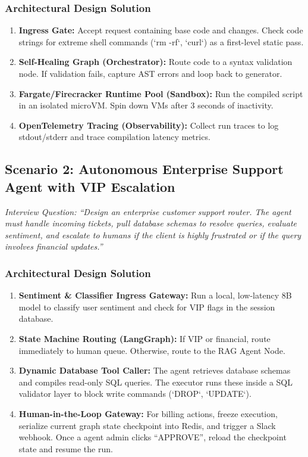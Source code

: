 \subsubsection{Architectural Design Solution}
\begin{enumerate}
    \item \textbf{Ingress Gate:} Accept request containing base code and changes. Check code strings for extreme shell commands (`rm -rf`, `curl`) as a first-level static pass.
    \item \textbf{Self-Healing Graph (Orchestrator):} Route code to a syntax validation node. If validation fails, capture AST errors and loop back to generator.
    \item \textbf{Fargate/Firecracker Runtime Pool (Sandbox):} Run the compiled script in an isolated microVM. Spin down VMs after 3 seconds of inactivity.
    \item \textbf{OpenTelemetry Tracing (Observability):} Collect run traces to log stdout/stderr and trace compilation latency metrics.
\end{enumerate}

\subsection{Scenario 2: Autonomous Enterprise Support Agent with VIP Escalation}
\textit{Interview Question: ``Design an enterprise customer support router. The agent must handle incoming tickets, pull database schemas to resolve queries, evaluate sentiment, and escalate to humans if the client is highly frustrated or if the query involves financial updates.''}

\subsubsection{Architectural Design Solution}
\begin{enumerate}
    \item \textbf{Sentiment \& Classifier Ingress Gateway:} Run a local, low-latency 8B model to classify user sentiment and check for VIP flags in the session database.
    \item \textbf{State Machine Routing (LangGraph):} If VIP or financial, route immediately to human queue. Otherwise, route to the RAG Agent Node.
    \item \textbf{Dynamic Database Tool Caller:} The agent retrieves database schemas and compiles read-only SQL queries. The executor runs these inside a SQL validator layer to block write commands (`DROP`, `UPDATE`).
    \item \textbf{Human-in-the-Loop Gateway:} For billing actions, freeze execution, serialize current graph state checkpoint into Redis, and trigger a Slack webhook. Once a agent admin clicks ``APPROVE'', reload the checkpoint state and resume the run.
\end{enumerate}

